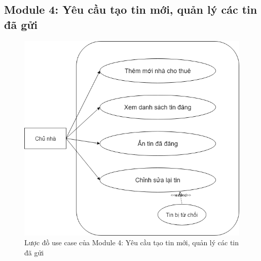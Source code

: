\subsection{Module 4: Yêu cầu tạo tin mới, quản lý các tin đã gửi}
\begin{figure}[!h]
	\centering
	\includegraphics[scale=0.5]{parts/bao/images/Module3UseCase.png}
	\caption{Lược đồ use case của Module 4: Yêu cầu tạo tin mới, quản lý các tin đã gửi}
\end{figure}

